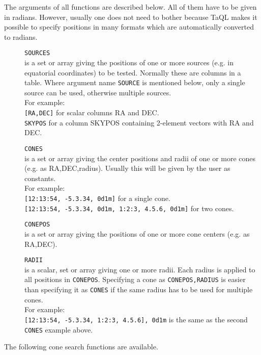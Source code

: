The arguments of all functions are described below. All of them have
to be given in radians. However, usually one does not need to bother
because TaQL makes it possible
to specify positions in many formats which are automatically converted
to radians.
\begin{description}
  \item[] \texttt{SOURCES}\\
       is a set or array giving the positions of one or more
       sources (e.g. in equatorial coordinates)
       to be tested. Normally these are columns in a table.
       Where argument name \texttt{SOURCE} is mentioned below, only a
       single source can be used, otherwise multiple sources.
       \\For example:
       \\\texttt{[RA,DEC]} for scalar columns RA and DEC.
       \\\texttt{SKYPOS} for a column SKYPOS containing 2-element
       vectors with RA and DEC.
  \item[] \texttt{CONES}\\
       is a set or array giving the center positions and radii of
       one or more cones (e.g. as RA,DEC,radius).
       Usually this will be given by the user as constants.
       \\For example:
       \\\texttt{[12:13:54, -5.3.34, 0d1m]} for a single cone.
       \\\texttt{[12:13:54, -5.3.34, 0d1m, 1:2:3, 4.5.6, 0d1m]} for two cones.
  \item[] \texttt{CONEPOS}\\
       is a set or array giving the positions of one or more
       cone centers (e.g. as RA,DEC).
  \item[] \texttt{RADII}\\
       is a scalar, set or array giving one or more radii.
       Each radius is applied to all positions in \texttt{CONEPOS}.
       Specifying a cone as \texttt{CONEPOS,RADIUS} is easier than specifying
       it as \texttt{CONES} if the same radius has to be used for
       multiple cones.
       \\For example:
       \\\texttt{[12:13:54, -5.3.34, 1:2:3, 4.5.6], 0d1m} is the same
       as the second \texttt{CONES} example above.
\end{description}
The following cone search functions are available.
